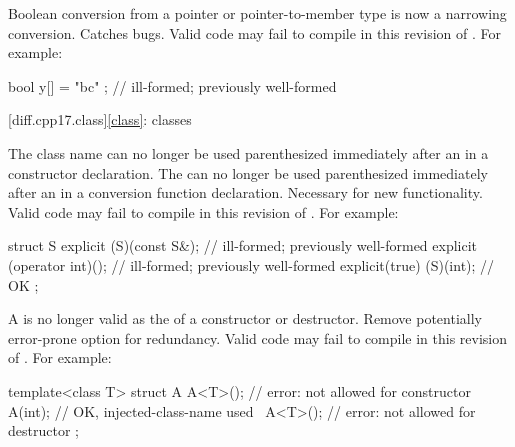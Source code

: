 \change
Boolean conversion from a pointer or pointer-to-member type
is now a narrowing conversion.
\rationale
Catches bugs.
\effect
Valid \CppXVII{} code may fail to compile
in this revision of \Cpp{}. For example:
\begin{codeblock}
bool y[] = { "bc" };    // ill-formed; previously well-formed
\end{codeblock}

[diff.cpp17.class]{\ref{class}: classes}

\change
The class name can no longer be used parenthesized
immediately after an  
in a constructor declaration.
The  can no longer be used parenthesized
immediately after an  
in a conversion function declaration.
\rationale
Necessary for new functionality.
\effect
Valid \CppXVII{} code may fail to compile
in this revision of \Cpp{}. For example:
\begin{codeblock}
struct S {
  explicit (S)(const S&);       // ill-formed; previously well-formed
  explicit (operator int)();    // ill-formed; previously well-formed
  explicit(true) (S)(int);      // OK
};
\end{codeblock}

\change
A 
is no longer valid as the  of a constructor or destructor.
\rationale
Remove potentially error-prone option for redundancy.
\effect
Valid \CppXVII{} code may fail to compile
in this revision of \Cpp{}. For example:
\begin{codeblock}
template<class T>
struct A {
  A<T>();           // error:  not allowed for constructor
  A(int);           // OK, injected-class-name used
  ~A<T>();          // error:  not allowed for destructor
};
\end{codeblock}

